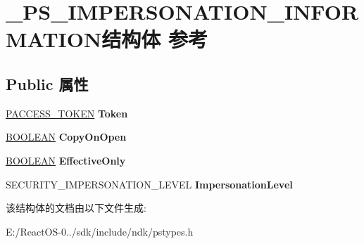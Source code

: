 \hypertarget{struct___p_s___i_m_p_e_r_s_o_n_a_t_i_o_n___i_n_f_o_r_m_a_t_i_o_n}{}\section{\+\_\+\+P\+S\+\_\+\+I\+M\+P\+E\+R\+S\+O\+N\+A\+T\+I\+O\+N\+\_\+\+I\+N\+F\+O\+R\+M\+A\+T\+I\+O\+N结构体 参考}
\label{struct___p_s___i_m_p_e_r_s_o_n_a_t_i_o_n___i_n_f_o_r_m_a_t_i_o_n}
\subsection*{Public 属性}
\begin{DoxyCompactItemize}
\item 
\mbox{\label{struct___p_s___i_m_p_e_r_s_o_n_a_t_i_o_n___i_n_f_o_r_m_a_t_i_o_n_a45fd4851e7c95643a168237a3eafebd0}} 
\hyperlink{interfacevoid}{P\+A\+C\+C\+E\+S\+S\+\_\+\+T\+O\+K\+EN} {\bfseries Token}
\item 
\mbox{\label{struct___p_s___i_m_p_e_r_s_o_n_a_t_i_o_n___i_n_f_o_r_m_a_t_i_o_n_ad5b3578920e51fa3278197b32079be5f}} 
\hyperlink{_processor_bind_8h_a112e3146cb38b6ee95e64d85842e380a}{B\+O\+O\+L\+E\+AN} {\bfseries Copy\+On\+Open}
\item 
\mbox{\label{struct___p_s___i_m_p_e_r_s_o_n_a_t_i_o_n___i_n_f_o_r_m_a_t_i_o_n_ac8db0dc2a40a52604a1ef1a18c3c047d}} 
\hyperlink{_processor_bind_8h_a112e3146cb38b6ee95e64d85842e380a}{B\+O\+O\+L\+E\+AN} {\bfseries Effective\+Only}
\item 
\mbox{\label{struct___p_s___i_m_p_e_r_s_o_n_a_t_i_o_n___i_n_f_o_r_m_a_t_i_o_n_aaf7185598ee9ca054acfaf547d3dcc34}} 
S\+E\+C\+U\+R\+I\+T\+Y\+\_\+\+I\+M\+P\+E\+R\+S\+O\+N\+A\+T\+I\+O\+N\+\_\+\+L\+E\+V\+EL {\bfseries Impersonation\+Level}
\end{DoxyCompactItemize}


该结构体的文档由以下文件生成\+:\begin{DoxyCompactItemize}
\item 
E\+:/\+React\+O\+S-\/0../sdk/include/ndk/pstypes.\+h\end{DoxyCompactItemize}
